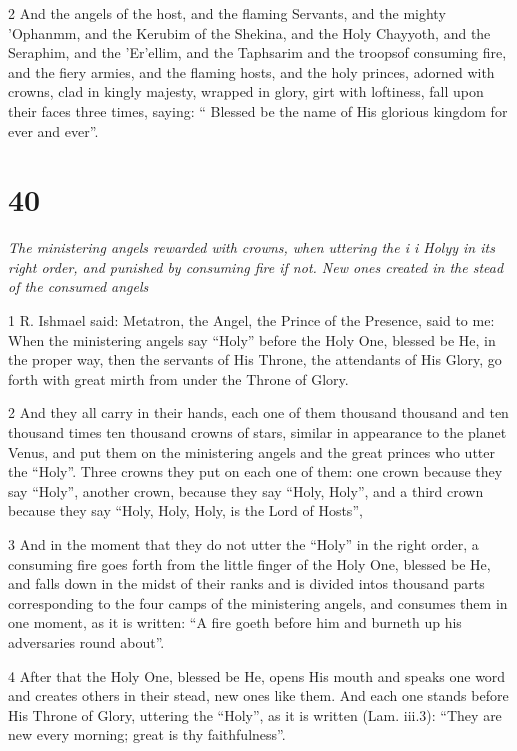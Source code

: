 \par 2 And the angels of the host, and the flaming Servants, and the mighty 'Ophanmm, and the Kerubim of the Shekina, and the Holy Chayyoth, and the Seraphim, and the 'Er'ellim, and the Taphsarim and the troopsof consuming fire, and the fiery armies, and the flaming hosts, and the holy princes, adorned with crowns, clad in kingly majesty, wrapped in glory, girt with loftiness, fall upon their faces three times, saying: “ Blessed be the name of His glorious kingdom for ever and ever”. 


\chapter{40}

\par \textit{The ministering angels rewarded with crowns, when uttering the i i Holyy in its right order, and punished by consuming fire if not. New ones created in the stead of the consumed angels}

\par 1 R. Ishmael said: Metatron, the Angel, the Prince of the Presence, said to me: When the ministering angels say “Holy” before the Holy One, blessed be He, in the proper way, then the servants of His Throne, the attendants of His Glory, go forth with great mirth from under the Throne of Glory.

\par 2 And they all carry in their hands, each one of them thousand thousand and ten thousand times ten thousand crowns of stars, similar in appearance to the planet Venus, and put them on the ministering angels and the great princes who utter the “Holy”. Three crowns they put on each one of them: one crown because they say “Holy”, another crown, because they say “Holy, Holy”, and a third crown because they say “Holy, Holy, Holy, is the Lord of Hosts”, 

\par 3 And in the moment that they do not utter the “Holy” in the right order, a consuming fire goes forth from the little finger of the Holy One, blessed be He, and falls down in the midst of their ranks and is divided intos thousand parts corresponding to the four camps of the ministering angels, and consumes them in one moment, as it is written: “A fire goeth before him and burneth up his adversaries round about”. 

\par 4 After that the Holy One, blessed be He, opens His mouth and speaks one word and creates others in their stead, new ones like them. And each one stands before His Throne of Glory, uttering the “Holy”, as it is written (Lam. iii.3): “They are new every morning; great is thy faithfulness”.


